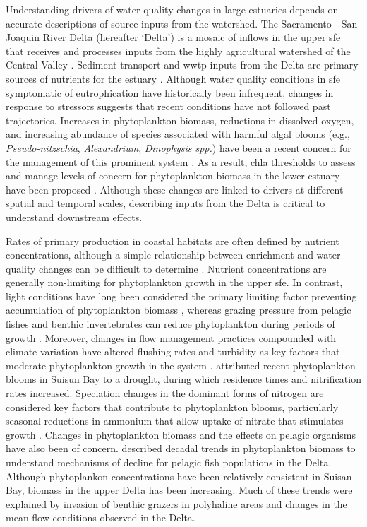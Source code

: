 \documentclass[letterpaper,12pt,oneside]{article}\usepackage[]{graphicx}\usepackage[]{color}
\begin{document}
Understanding drivers of water quality changes in large estuaries depends on accurate descriptions of source inputs from the watershed. The Sacramento - San Joaquin River Delta (hereafter `Delta') is a mosaic of inflows in the upper \ac{sfe} that receives and processes inputs from the highly agricultural watershed of the Central Valley \citep{Jassby00,Jassby02,Jassby08}. Sediment transport and \ac{wwtp} inputs from the Delta are primary sources of nutrients for the estuary \citep{Dugdale07,Cornwell14}.  Although water quality conditions in \ac{sfe} symptomatic of eutrophication have historically been infrequent, changes in response to stressors suggests that recent conditions have not followed past trajectories. Increases in phytoplankton biomass, reductions in dissolved oxygen, and increasing abundance of species associated with harmful algal blooms (e.g., \textit{Pseudo-nitzschia}, \textit{Alexandrium}, \textit{Dinophysis spp.}) have been a recent concern for the management of this prominent system \citep{Lehman05,Cloern05,Cloern07,Shellenbarger08}.  As a result, \ac{chla} thresholds to assess and manage levels of concern for phytoplankton biomass in the lower estuary have been proposed \citep{Sutula17}. Although these changes are linked to drivers at different spatial and temporal scales, describing inputs from the Delta is critical to understand downstream effects.  

Rates of primary production in coastal habitats are often defined by nutrient concentrations, although a simple relationship between enrichment and water quality changes can be difficult to determine \citep{Cloern01}. Nutrient concentrations are generally non-limiting for phytoplankton growth in the upper \ac{sfe}.  In contrast, light conditions have long been considered the primary limiting factor preventing accumulation of phytoplankton biomass \citep{Cole84,Alpine88}, whereas grazing pressure from pelagic fishes and benthic invertebrates can reduce phytoplankton during periods of growth \citep{Nichols85,Jassby08,Kimmerer14}.  Moreover, changes in flow management practices compounded with climate variation have altered flushing rates and turbidity as key factors that moderate phytoplankton growth in the system \citep{Alpine92,Lehman00,Wright04,Canuel09}.  \citet{Glibert14} attributed recent phytoplankton blooms in Suisun Bay to a drought, during which residence times and nitrification rates increased.  Speciation changes in the dominant forms of nitrogen are considered key factors that contribute to phytoplankton blooms, particularly seasonal reductions in ammonium that allow uptake of nitrate that stimulates growth \citep{Dortch90,Dugdale07}. Changes in phytoplankton biomass and the effects on pelagic organisms have also been of concern.  \citet{Jassby08} described decadal trends in phytoplankton biomass to understand mechanisms of decline for pelagic fish populations in the Delta.  Although phytoplankon concentrations have been relatively consistent in Suisan Bay, biomass in the upper Delta has been increasing.  Much of these trends were explained by invasion of benthic grazers in polyhaline areas and changes in the mean flow conditions observed in the Delta.  
\end{document}
